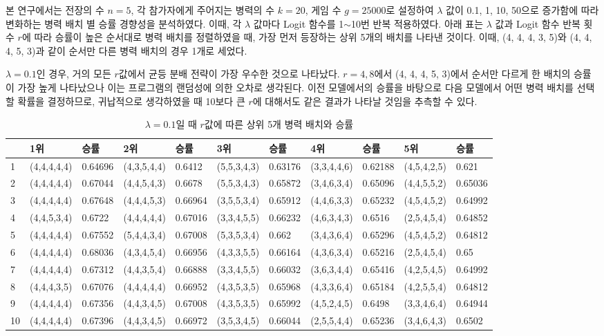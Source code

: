 본 연구에서는 전장의 수 $n=5$, 각 참가자에게 주어지는 병력의 수 $k=20$, 게임 수 $g=25000$로 설정하여 $\lambda$ 값이 0.1, 1, 10, 50으로 증가함에 따라 변화하는 병력 배치 별 승률 경향성을 분석하였다. 이때, 각 $\lambda$ 값마다 Logit 함수를 1$\sim$10번 반복 적용하였다. 아래 표는 $\lambda$ 값과 Logit 함수 반복 횟수 $r$에 따라 승률이 높은 순서대로 병력 배치를 정렬하였을 때, 가장 먼저 등장하는 상위 5개의 배치를 나타낸 것이다. 이때, (4, 4, 4, 3, 5)와 (4, 4, 4, 5, 3)과 같이 순서만 다른 병력 배치의 경우 1개로 세었다.

$\lambda=0.1$인 경우, 거의 모든 $r$값에서 균등 분배 전략이 가장 우수한 것으로 나타났다. $r=4, 8$에서 (4, 4, 4, 5, 3)에서 순서만 다르게 한 배치의 승률이 가장 높게 나타났으나 이는 프로그램의 랜덤성에 의한 오차로 생각된다. 이전 모델에서의 승률을 바탕으로 다음 모델에서 어떤 병력 배치를 선택할 확률을 결정하므로, 귀납적으로 생각하였을 때 10보다 큰 $r$에 대해서도 같은 결과가 나타날 것임을 추측할 수 있다.\\
\begin{table}[htb]
    \centering
    \caption{$\lambda = 0.1$일 때 $r$값에 따른 상위 5개 병력 배치와 승률}
    {\scriptsize
    \begin{tabular}{l|ll|ll|ll|ll|ll}
     & 1위       & 승률      & 2위       & 승률      & 3위       & 승률      & 4위       & 승률      & 5위       & 승률      \\ \hline
    1               & (4,4,4,4,4) & 0.64696 & (4,3,5,4,4) & 0.6412  & (5,5,3,4,3) & 0.63176 & (3,3,4,4,6) & 0.62188 & (4,5,4,2,5) & 0.621   \\
    2               & (4,4,4,4,4) & 0.67044 & (4,4,5,4,3) & 0.6678  & (5,5,3,4,3) & 0.65872 & (3,4,6,3,4) & 0.65096 & (4,4,5,5,2) & 0.65036 \\
    3               & (4,4,4,4,4) & 0.67648 & (4,4,4,5,3) & 0.66964 & (3,5,5,3,4) & 0.65912 & (4,4,6,3,3) & 0.65232 & (4,5,4,5,2) & 0.64992 \\
    4               & (4,4,5,3,4) & 0.6722  & (4,4,4,4,4) & 0.67016 & (3,3,4,5,5) & 0.66232 & (4,6,3,4,3) & 0.6516  & (2,5,4,5,4) & 0.64852 \\
    5               & (4,4,4,4,4) & 0.67552 & (5,4,4,3,4) & 0.67008 & (5,3,5,3,4) & 0.662   & (3,4,3,6,4) & 0.65296 & (4,5,4,5,2) & 0.64812 \\
    6               & (4,4,4,4,4) & 0.68036 & (4,3,4,5,4) & 0.66956 & (4,3,3,5,5) & 0.66164 & (4,3,6,3,4) & 0.65216 & (2,5,4,5,4) & 0.65    \\
    7               & (4,4,4,4,4) & 0.67312 & (4,4,3,5,4) & 0.66888 & (3,3,4,5,5) & 0.66032 & (3,6,3,4,4) & 0.65416 & (4,2,5,4,5) & 0.64992 \\
    8               & (4,4,4,3,5) & 0.67076 & (4,4,4,4,4) & 0.66952 & (4,3,5,3,5) & 0.65968 & (4,3,3,6,4) & 0.65184 & (4,2,5,5,4) & 0.64812 \\
    9               & (4,4,4,4,4) & 0.67356 & (4,4,3,4,5) & 0.67008 & (4,3,5,3,5) & 0.65992 & (4,5,2,4,5) & 0.6498  & (3,3,4,6,4) & 0.64944 \\
    10              & (4,4,4,4,4) & 0.67396 & (4,4,3,4,5) & 0.66972 & (3,5,3,4,5) & 0.66044 & (2,5,5,4,4) & 0.65236 & (3,4,6,4,3) & 0.6502 
    \end{tabular}
    }
    \label{tab:my_label}
\end{table}

